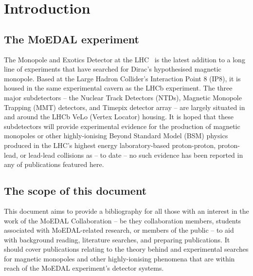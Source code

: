 \section{Introduction}
\label{sec:intro}

\subsection{The MoEDAL experiment}
\label{sec:moedalintro}

The Monopole and Exotics Detector at the LHC~\cite{MoEDAL2009}
is the latest addition to a long line of experiments that have searched for
Dirac's hypothesised magnetic monopole.
%
Based at the Large Hadron Collider's Interaction Point 8 (IP8),
it is housed in the same experimental cavern as the LHCb experiment.
%
The three major subdetectors -- the Nuclear Track Detectors (NTDs),
Magnetic Monopole Trapping (MMT) detectors, and
Timepix detector array --
are largely situated in and around the LHCb VeLo (Vertex Locator) housing.
%
It is hoped that these subdetectors will provide experimental evidence
for the production of magnetic monopoles or other highly-ionising
Beyond Standard Model (BSM) physics produced in the LHC's
highest energy laboratory-based
proton-proton, proton-lead, or lead-lead collisions as -- to date --
no such evidence has been reported in any of publications featured here.

\subsection{The scope of this document}
\label{sec:scope}
This document aims to provide a bibliography for all those
with an interest in the work of the MoEDAL Collaboration -- be they
collaboration members, students associated with MoEDAL-related research,
or members of the public --
to aid with background reading, literature searches, and
preparing publications.
%
It should cover publications relating to the theory behind
and experimental searches for magnetic monopoles and
other highly-ionising phenomena that are within reach
of the MoEDAL experiment's detector systems.
%

